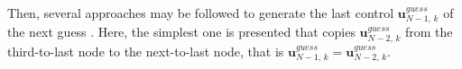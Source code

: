 Then, several approaches may be followed to generate the last control $\mathbf{u}_{N-1,\,k}^{guess}$ of the next guess \cite{gros2020linear}. Here, the simplest one is presented that copies $\mathbf{u}_{N-2,\,k}^{guess}$ from the third-to-last node to the next-to-last node, that is $\mathbf{u}_{N-1,\,k}^{guess} = \mathbf{u}_{N-2,\,k}^{guess}$.

